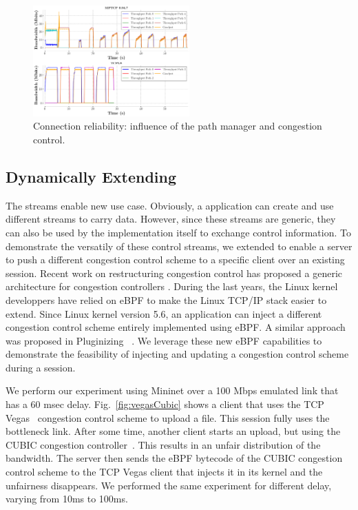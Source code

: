 \begin{figure}[!t]
  \begin{center}
    \includegraphics[width=6cm]{figures/tcpls_mptcp.png}
  \end{center}
  \caption{Connection reliability: influence of the path manager and congestion
  control.}
\end{figure}



\subsection{Dynamically Extending \tcpls}

The \tcpls streams enable new use case. Obviously, a \tcpls application can
create and use different streams to carry data. However, since these streams
are generic, they can also be used by the \tcpls implementation itself to
exchange control information. To demonstrate the versatily of these control
streams, we extended \tcpls to enable a server to push a different congestion
control scheme to a specific client over an existing \tcpls session. Recent
work on restructuring congestion control has proposed a generic architecture
for congestion controllers \cite{narayan2018restructuring}.
During the last years, the Linux kernel developpers have relied on eBPF
to make the Linux TCP/IP stack \cite{brakmo2017tcp,tran2020beyond} easier
to extend. Since Linux kernel version 5.6, an application can inject
a different congestion control scheme entirely implemented using eBPF. A similar approach was proposed in Pluginizing \quic~\cite{de2019pluginizing}.
We leverage these new eBPF capabilities to demonstrate the feasibility of injecting and updating a congestion control scheme during a \tcpls session.

We perform our experiment using Mininet  over a 100 Mbps emulated link that has a 60 msec delay. Fig.~\ref{fig:vegasCubic} shows a client that uses the TCP Vegas~\cite{10.1145/190314.190317} congestion control scheme to upload a file. This \tcpls session fully uses the bottleneck link. After some time, another client starts an upload, but using the CUBIC congestion controller~\cite{rfc8312}. This results in an unfair distribution of the bandwidth. The server then sends the eBPF bytecode of the CUBIC congestion control scheme to the TCP Vegas client that injects it in its kernel and the unfairness disappears.  We performed the same experiment for different delay, varying from 10ms to 100ms.

